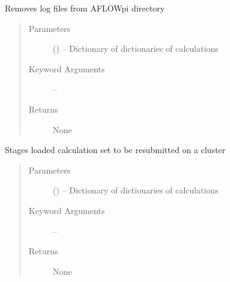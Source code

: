 \documentclass[letterpaper,10pt,english]{sphinxmanual}
\begin{document}

\begin{fulllineitems}
\label{\detokenize{run:run.reduce_kpoints}}
\end{fulllineitems}


\begin{fulllineitems}
\label{\detokenize{run:run.reset_logs}}
Removes log files from AFLOWpi directory
\begin{quote}\begin{description}
\item[{Parameters}] \leavevmode
{} () -- Dictionary of dictionaries of calculations

\item[{Keyword Arguments}] \leavevmode
{} -- 

\item[{Returns}] \leavevmode
None

\end{description}\end{quote}

\end{fulllineitems}


\begin{fulllineitems}
\label{\detokenize{run:run.resubmit}}
Stages loaded calculation set to be resubmitted on a cluster
\begin{quote}\begin{description}
\item[{Parameters}] \leavevmode
{} () -- Dictionary of dictionaries of calculations

\item[{Keyword Arguments}] \leavevmode
{} -- 

\item[{Returns}] \leavevmode
None

\end{description}\end{quote}

\end{fulllineitems}
\end{document}
